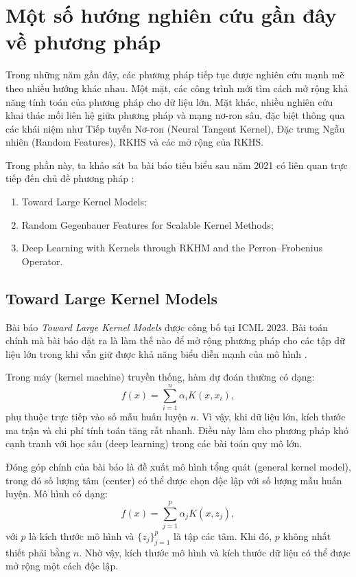 \section{Một số hướng nghiên cứu gần đây về phương pháp
\protect{}}

Trong những năm gần đây, các phương pháp  tiếp tục được nghiên cứu
mạnh mẽ theo nhiều hướng khác nhau. Một mặt, các công trình mới tìm cách mở
rộng khả năng tính toán của phương pháp  cho dữ liệu lớn. Mặt khác,
nhiều nghiên cứu khai thác mối liên hệ giữa phương pháp  và mạng
nơ-ron sâu, đặc biệt thông qua các khái niệm như  Tiếp tuyến Nơ-ron
(Neural Tangent Kernel), Đặc trưng Ngẫu nhiên (Random Features), RKHS và các
mở rộng của RKHS.

Trong phần này, ta khảo sát ba bài báo tiêu biểu sau năm 2021 có liên quan
trực tiếp đến chủ đề phương pháp :
\begin{enumerate}
  \item Toward Large Kernel Models;
  \item Random Gegenbauer Features for Scalable Kernel Methods;
  \item Deep Learning with Kernels through RKHM and the Perron--Frobenius
  Operator.
\end{enumerate}

\subsection{Toward Large Kernel Models}

Bài báo \emph{Toward Large Kernel Models} được công bố tại ICML 2023. Bài toán
chính mà bài báo đặt ra là làm thế nào để mở rộng phương pháp  cho
các tập dữ liệu lớn trong khi vẫn giữ được khả năng biểu diễn mạnh của mô hình
 \cite{abedsoltan2023largekernelmodels}.

Trong máy  (kernel machine) truyền thống, hàm dự đoán thường có
dạng:
\begin{equation}
  f(x) = \sum_{i=1}^{n} \alpha_i K(x,x_i),
\end{equation}
phụ thuộc trực tiếp vào số mẫu huấn luyện $n$. Vì vậy, khi dữ liệu lớn, kích
thước ma trận  và chi phí tính toán tăng rất nhanh. Điều này làm
cho phương pháp  khó cạnh tranh với học sâu (deep learning) trong
các bài toán quy mô lớn.

Đóng góp chính của bài báo là đề xuất mô hình  tổng quát
(general kernel model), trong đó số lượng tâm (center) có thể được chọn độc
lập với số lượng mẫu huấn luyện. Mô hình có dạng:
\begin{equation}
  f(x) = \sum_{j=1}^{p} \alpha_j K(x,z_j),
\end{equation}
với $p$ là kích thước mô hình và $\{z_j\}_{j=1}^{p}$ là tập các tâm. Khi đó,
$p$ không nhất thiết phải bằng $n$. Nhờ vậy, kích thước mô hình và kích thước
dữ liệu có thể được mở rộng một cách độc lập.

